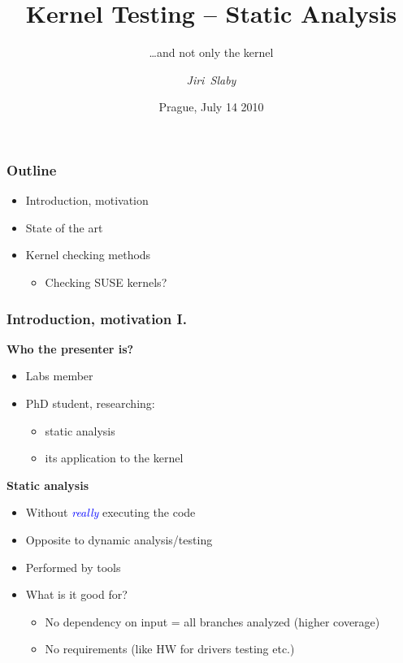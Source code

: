 \documentclass[handout,xcolor=dvipsnames]{beamer}
\title{Kernel Testing -- Static Analysis}
\subtitle{\ldots and not only the kernel}
\author[J. Slaby]{\emph{Jiri~Slaby}}
\institute{Suse Labs, Novell}
\date[7/14/2010, Prague]{Prague, July 14 2010}
\let\Oldemph\emph
\renewcommand{\emph}[1]{\textcolor{blue}{\Oldemph{#1}}}
\newcommand{\heading}[1]{\textbf{\textcolor{BurntOrange}{#1}}}
\begin{document}
\begin{frame}
  \titlepage
\end{frame}


\begin{frame}
  \frametitle{Outline}
  \begin{itemize}
  \item Introduction, motivation
  \item State of the art
  \item Kernel checking methods
  \begin{itemize}
  \item Checking SUSE kernels?
  \end{itemize}
  \end{itemize}
\end{frame}

\begin{frame}
  \frametitle{Introduction, motivation I.}
  \heading{Who the presenter is?}
  \begin{itemize}
  \item Labs member
  \item PhD student, researching:
  \begin{itemize}
  \item static analysis
  \item its application to the kernel
  \end{itemize}
  \end{itemize}

  \medskip
  \pause

  \heading{Static analysis}
  \begin{itemize}
  \item Without \emph{really} executing the code
  \item Opposite to dynamic analysis/testing
  \item Performed by tools
  \item What is it good for?
  \begin{itemize}
  \item No dependency on input = all branches analyzed (higher coverage)
  \item No requirements (like HW for drivers testing etc.)
  \end{itemize}
  \end{itemize}

\end{frame}
\end{document}
